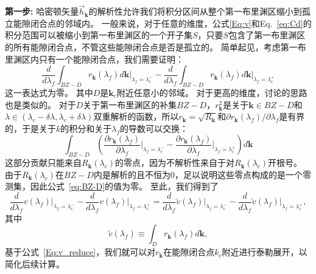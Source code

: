 			{\bf 第一步:}
			哈密顿矢量${\vec{h}}_{\mathbf{k}}$的解析性允许我们将积分区间从整个第一布里渊区缩小到孤立能隙闭合点的邻域内。
			一般来说，对于任意的维度，公式\eqref{Eq:v}和Eq.~\eqref{eq:Cd}的积分范围可以被缩小到第一布里渊区的一个开子集$S$，只要$S$包含了第一布里渊区的所有能隙闭合点，不管这些能隙闭合点是否是孤立的。
			简单起见，考虑第一布里渊区内只有一个能隙闭合点，我们需要证明：
			\begin{equation}\label{eq:BZ-D}
				\frac{d}{d\lambda_f} \int_{BZ-D} r_\mathbf{k}(\lambda_f) d\mathbf{k} \bigg|_{\lambda_f=\lambda_c^-} - \frac{d}{d\lambda_f} \int_{BZ-D} r_\mathbf{k}(\lambda_f) d\mathbf{k} \bigg|_{\lambda_f=\lambda_c^+}
			\end{equation}
			这一表达式为零。
			其中$D$是$\mathbf{k}_c$附近任意小的邻域。
			对于更高的维度，讨论的思路也是类似的。
			对于$D$关于第一布里渊区的补集$BZ-D$，$r_\mathbf{k}^2$是关于$\mathbf{k} \in BZ-D$和$\lambda \in (\lambda_c-\delta \lambda, \lambda_c+\delta \lambda)$双重解析的函数，所以$r_\mathbf{k}=\sqrt{R_\mathbf{k}}$和${\partial r_\mathbf{k}(\lambda_f)}/{\partial \lambda_f}$是有界的，于是关于$k$的积分和关于$\lambda_f$的导数可以交换：
			\begin{equation}
				\int_{BZ-D} \left(\frac{\partial r_\mathbf{k}(\lambda_f)}{\partial\lambda_f}  \bigg|_{\lambda_f = \lambda_c^-} - \frac{\partial r_\mathbf{k}(\lambda_f)}{\partial\lambda_f} \bigg|_{\lambda_f=\lambda_c^+}\right) d\mathbf{k}
			\end{equation}
			这部分贡献只能来自$R_\mathbf{k}(\lambda_c)$的零点，因为不解析性来自于对$R_\mathbf{k}(\lambda_c)$开根号。
			由于$R_\mathbf{k}(\lambda_c)$在$BZ-D$内是解析的且不恒为0，足以说明这些零点构成的是一个零测集，因此公式~\eqref{eq:BZ-D}的值为零。
			至此，我们得到了
			\begin{equation}
				\frac{d}{d\lambda_f} v(\lambda_f) \bigg|_{\lambda_f=\lambda_c^-} - \frac{d}{d\lambda_f} v(\lambda_f) \bigg|_{\lambda_f=\lambda_c^+}=\frac{d}{d\lambda_f} \tilde{v}(\lambda_f) \bigg|_{\lambda_f=\lambda_c^-} - \frac{d}{d\lambda_f} \tilde{v}(\lambda_f) \bigg|_{\lambda_f=\lambda_c^+},
			\end{equation}
			其中
			\begin{equation}\label{Eq:v_reduce}
				\tilde{v}(\lambda_f) \equiv \int_{D}{r_\mathbf{k}(\lambda_f) d\mathbf{k}},
			\end{equation}
			基于公式~\eqref{Eq:v_reduce}，我们就可以对$r_\mathbf{k}$在能隙闭合点$k_c$附近进行泰勒展开，以简化后续计算。
			
